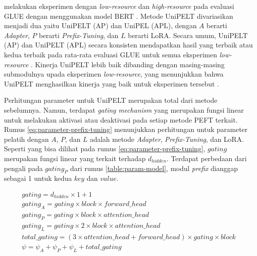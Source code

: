 \citeauthor{unipelt} melakukan eksperimen dengan \textit{low-resource} dan \textit{high-resource} pada evaluasi GLUE dengan menggunakan model BERT \parencite{unipelt}. Metode UniPELT divariasikan menjadi dua yaitu UniPELT (AP) dan UniPEL (APL), dengan $A$ berarti \textit{Adapter}, $P$ berarti \textit{Prefix-Tuning}, dan $L$ berarti LoRA. Secara umum, UniPELT (AP) dan UniPELT (APL) secara konsisten mendapatkan hasil yang terbaik atau kedua terbaik pada rata-rata evaluasi GLUE untuk semua eksperimen \textit{low-resource} \parencite{unipelt}. Kinerja UniPELT lebih baik dibanding dengan masing-masing submodulnya upada eksperimen \textit{low-resource}, yang menunjukkan bahwa UniPELT menghasilkan kinerja yang baik untuk eksperimen tersebut \parencite{unipelt}.

Perhitungan parameter untuk UniPELT merupakan total dari metode sebelumnya. Namun, terdapat \textit{gating mechanism} yang merupakan fungsi linear untuk melakukan aktivasi atau deaktivasi pada setiap metode PEFT terkait. Rumus \ref{eq:parameter-prefix-tuning} menunjukkan perhitungan untuk parameter pelatih dengan $A$, $P$, dan $L$ adalah metode \textit{Adapter}, \textit{Prefix-Tuning}, dan LoRA. Seperti yang bisa dilihat pada rumus \ref{eq:parameter-prefix-tuning}, $gating$ merupakan fungsi linear yang terkait terhadap $d_{hidden}$. Terdapat perbedaan dari pengali pada $gating_{P}$ dari rumus \ref{table:param-model}, modul \textit{prefix} dianggap sebagai 1 untuk kedua $key$ dan $value$.

\begin{equation}
    \begin{aligned}
        gating = d_{hidden} \times 1 + 1 \\
        gating_{A} = gating \times block \times forward\_head \\
        gating_{P} = gating \times block \times attention\_head \\
        gating_{L} = gating \times 2 \times block \times attention\_head \\
        total\_gating = (3 \times attention\_head + forward\_head) \times gating \times block \\
        \psi = \psi_A + \psi_P + \psi_L + total\_gating
    \end{aligned}
    \label{eq:parameter-unipelt}
\end{equation}

